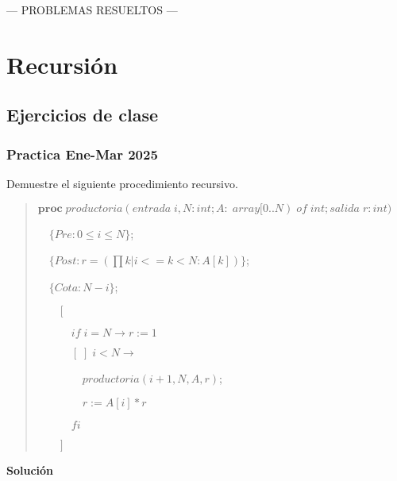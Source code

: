 \documentclass[hidelinks]{article}
\newenvironment{absolutelynopagebreak}
{\Needspace{10\baselineskip}\begin{quote}}
		{\end{quote}}
\begin{document}
\newpage
\vspace*{\fill}
\hspace*{\fill} --- PROBLEMAS RESUELTOS --- \hspace*{\fill}
\vspace*{\fill}
\thispagestyle{empty}
\newpage

\section{Recursión}

\subsection{Ejercicios de clase}\par

\subsubsection{Practica Ene-Mar 2025}

Demuestre el siguiente procedimiento recursivo.\par

\begin{absolutelynopagebreak}
	$\textbf{proc} \; productoria(entrada \; i, N: int; A: \; array[0..N) \; of \; int; salida \; r: int)$ \par
	$\quad \{Pre: 0 \leq i \leq N\}$;\par
	$\quad \{Post: r = (\prod k | i <= k < N: A[k])\}$;\par
	$\quad \{Cota: N - i\}$;\par
	$\qquad [$\par
			$\qquad \quad if \; i = N \rightarrow r := 1$\par
			$\qquad \quad [\;] \; i < N \rightarrow $\par
			$\qquad \qquad productoria(i + 1, N, A, r)$;\par
			$\qquad \qquad r := A[i] * r $\par
			$\qquad \quad fi$\par
			$\qquad ]$\par
\end{absolutelynopagebreak}\par

\textbf{Solución}
\end{document}

